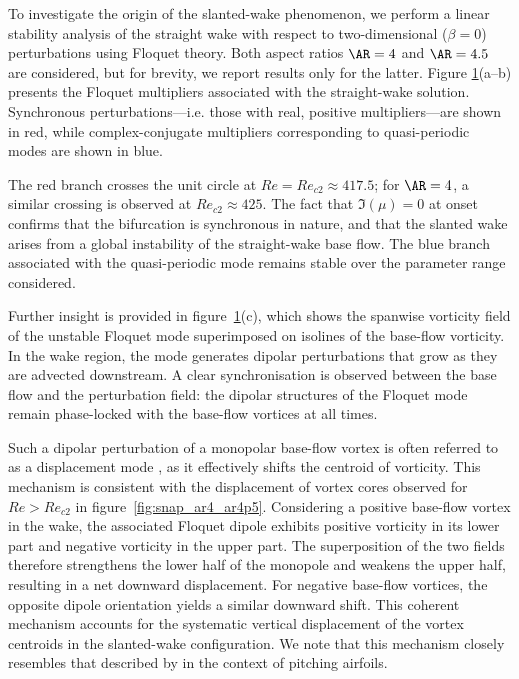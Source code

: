 \begin{figure}
\label{fig:AR4p5_modes_Re430_beta0}
\end{figure}

To investigate the origin of the slanted-wake phenomenon, we perform a linear stability analysis of the straight wake with respect to two-dimensional ($\beta=0$) perturbations using Floquet theory. Both aspect ratios $\AR=4$ and $\AR=4.5$ are considered, but for brevity, we report results only for the latter. Figure \ref{fig:AR4p5_modes_Re430_beta0}(a--b) presents the Floquet multipliers associated with the straight-wake solution. Synchronous perturbations---i.e. those with real, positive multipliers---are shown in red, while complex-conjugate multipliers corresponding to quasi-periodic modes are shown in blue.

The red branch crosses the unit circle at $Re=Re_{c2} \approx 417.5$; for $\AR=4$, a similar crossing is observed at $Re_{c2} \approx 425$. The fact that $\Im(\mu) = 0$ at onset confirms that the bifurcation is synchronous in nature, and that the slanted wake arises from a global instability of the straight-wake base flow. The blue branch associated with the quasi-periodic mode remains stable over the parameter range considered.

Further insight is provided in figure~\ref{fig:AR4p5_modes_Re430_beta0}(c), which shows the spanwise vorticity field of the unstable Floquet mode superimposed on isolines of the base-flow vorticity. In the wake region, the mode generates dipolar perturbations that grow as they are advected downstream. A clear synchronisation is observed between the base flow and the perturbation field: the dipolar structures of the Floquet mode remain phase-locked with the base-flow vortices at all times.

Such a dipolar perturbation of a monopolar base-flow vortex is often referred to as a displacement mode \citep{brion-sipp-jacquin-2014}, as it effectively shifts the centroid of vorticity. This mechanism is consistent with the displacement of vortex cores observed for $Re>Re_{c2}$ in figure~\ref{fig:snap_ar4_ar4p5}. Considering a positive base-flow vortex in the wake, the associated Floquet dipole exhibits positive vorticity in its lower part and negative vorticity in the upper part. The superposition of the two fields therefore strengthens the lower half of the monopole and weakens the upper half, resulting in a net downward displacement. For negative base-flow vortices, the opposite dipole orientation yields a similar downward shift. This coherent mechanism accounts for the systematic vertical displacement of the vortex centroids in the slanted-wake configuration.
%
We note that this mechanism closely resembles that described by \citet{jallas-marquet-fabre-2017} in the context of pitching airfoils.

